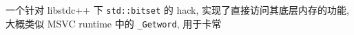 一个针对 libstdc++ 下 \verb|std::bitset| 的 hack, 实现了直接访问其底层内存的功能, 大概类似 MSVC runtime 中的 \verb|_Getword|, 用于卡常
